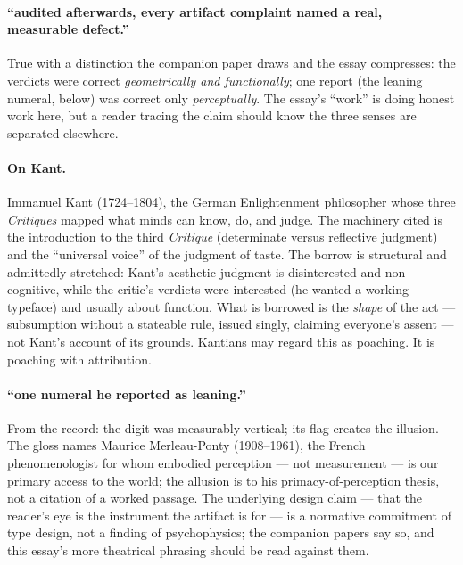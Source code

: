 \documentclass[11pt]{article}
\begin{document}
\paragraph{``audited afterwards, every artifact complaint named a real, measurable defect.''} True with a distinction the companion paper draws and the essay compresses: the verdicts were correct \emph{geometrically and functionally}; one report (the leaning numeral, below) was correct only \emph{perceptually}. The essay's ``work'' is doing honest work here, but a reader tracing the claim should know the three senses are separated elsewhere.

\paragraph{On Kant.} Immanuel Kant (1724--1804), the German Enlightenment philosopher whose three \emph{Critiques} mapped what minds can know, do, and judge. The machinery cited is the introduction to the third \emph{Critique} (determinate versus reflective judgment) and the ``universal voice'' of the judgment of taste. The borrow is structural and admittedly stretched: Kant's aesthetic judgment is disinterested and non-cognitive, while the critic's verdicts were interested (he wanted a working typeface) and usually about function. What is borrowed is the \emph{shape} of the act — subsumption without a stateable rule, issued singly, claiming everyone's assent — not Kant's account of its grounds. Kantians may regard this as poaching. It is poaching with attribution.

\paragraph{``one numeral he reported as leaning.''} From the record: the digit was measurably vertical; its flag creates the illusion. The gloss names Maurice Merleau-Ponty (1908--1961), the French phenomenologist for whom embodied perception — not measurement — is our primary access to the world; the allusion is to his primacy-of-perception thesis, not a citation of a worked passage. The underlying design claim — that the reader's eye is the instrument the artifact is for — is a normative commitment of type design, not a finding of psychophysics; the companion papers say so, and this essay's more theatrical phrasing should be read against them.
\end{document}

